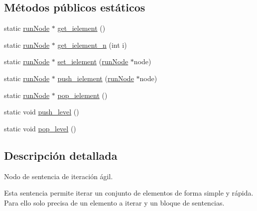 \subsection*{Métodos públicos estáticos}
\begin{DoxyCompactItemize}
\item 
static \hyperlink{classrunNode}{run\-Node} $\ast$ \hyperlink{classiloopNode_a28b29270e593f2bfa065336a71147f42}{get\-\_\-ielement} ()
\item 
static \hyperlink{classrunNode}{run\-Node} $\ast$ \hyperlink{classiloopNode_a59fd4b9110d999b9b8fc1b0c559da4b6}{get\-\_\-ielement\-\_\-n} (int i)
\item 
static \hyperlink{classrunNode}{run\-Node} $\ast$ \hyperlink{classiloopNode_ac3356c2e8e0a41cfbc009511961fa76a}{set\-\_\-ielement} (\hyperlink{classrunNode}{run\-Node} $\ast$node)
\item 
static \hyperlink{classrunNode}{run\-Node} $\ast$ \hyperlink{classiloopNode_a2ce7c03e4be22b5b316f353f028c6dc5}{push\-\_\-ielement} (\hyperlink{classrunNode}{run\-Node} $\ast$node)
\item 
static \hyperlink{classrunNode}{run\-Node} $\ast$ \hyperlink{classiloopNode_a335b05f20f829f155e0bad0e895dbf41}{pop\-\_\-ielement} ()
\item 
static void \hyperlink{classiloopNode_ac5978d4ff494c4248898b0a9c62f743a}{push\-\_\-level} ()
\item 
static void \hyperlink{classiloopNode_a03c333f0f0f2f5a7806ca3fc533a6b1b}{pop\-\_\-level} ()
\end{DoxyCompactItemize}


\subsection{Descripción detallada}
Nodo de sentencia de iteración ágil. 

Esta sentencia permite iterar un conjunto de elementos de forma simple y rápida. Para ello solo precisa de un elemento a iterar y un bloque de sentencias.

